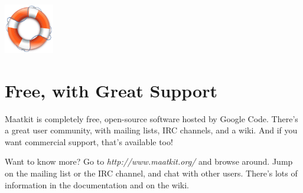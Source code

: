 \documentclass[letterpaper,twoside,12pt]{article}
\begin{document}
\begin{minipage}{0.2\textwidth}
\includegraphics[width=0.853in]{../image/support}
\end{minipage}
\begin{minipage}{0.8\textwidth}
\section*{Free, with Great Support}
Maatkit is completely free, open-source software hosted by Google Code.
There's a great user community, with mailing lists, IRC channels, and a wiki.
And if you want commercial support, that's available too!
\end{minipage}
\vspace*{1cm}

Want to know more?  Go to \emph{http://www.maatkit.org/} and browse around.
Jump on the mailing list or the IRC channel, and chat with other users.
There's lots of information in the documentation and on the wiki.

\newpage
\end{document}
